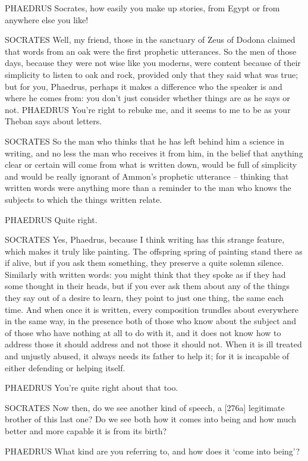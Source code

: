 PHAEDRUS Socrates, how easily you make up stories, from Egypt or from
anywhere else you like!

 SOCRATES Well, my friend, those in the sanctuary of Zeus of
Dodona claimed that words from an oak were the first prophetic
utterances. So the men of those days, because they were not wise like
you moderns, were content because of their simplicity to listen to oak
and rock, provided only
that they said  what was true; but for you, Phaedrus, perhaps it
makes a difference who the speaker is and where he comes from: you don't
just consider whether things are as he says or not. PHAEDRUS You're
right to rebuke me, and it seems to me to be as your Theban says about
letters.

SOCRATES So the man who thinks that he has left behind him  a
science in writing, and no less the man who receives it from him, in the
belief that anything clear or certain will come from what is written
down, would be full of simplicity and would be really ignorant of
Ammon's prophetic utterance -- thinking that written words were anything
more than a reminder to the man  who knows the subjects to which
the things written relate.

PHAEDRUS Quite right.

SOCRATES Yes, Phaedrus, because I think writing has this strange
feature, which makes it truly like painting. The offspring 
spring of painting stand there as if alive, but if you ask them
something, they preserve a quite solemn silence. Similarly with written
words: you might think that they spoke as if they had some thought in
their heads, but if you ever ask them about any of the things they say
out of a desire to learn, they point to just one thing, the same each
time. And when once it is written,  every composition trundles
about everywhere in the same way, in the presence both of those who know
about the subject and of those who have nothing at all to do with it,
and it does not know how to address those it should address and not
those it should not. When it is ill treated and unjustly abused, it
always needs its father to help it; for it is incapable of either
defending  or helping itself.

PHAEDRUS You're quite right about that too.

SOCRATES Now then, do we see another kind of
speech, a {[}276a{]}
legitimate brother of this last one? Do we see both how it comes into
being and how much better and more capable it is from its birth?

PHAEDRUS What kind are you referring to, and how does it ‘come into
being'?

